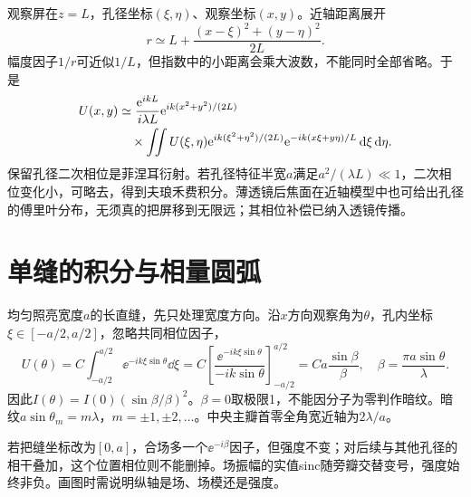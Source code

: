 观察屏在$z=L$，孔径坐标$(\xi,\eta)$、观察坐标$(x,y)$。近轴距离展开
\[
 r\simeq L+\frac{(x-\xi)^2+(y-\eta)^2}{2L}.
\]
幅度因子$1/r$可近似$1/L$，但指数中的小距离会乘大波数，不能同时全部省略。于是
\begin{align}\label{eq:o3fresnel}
 U(x,y)&\simeq\frac{\mathrm e^{ikL}}{i\lambda L}
 \mathrm e^{ik(x^2+y^2)/(2L)}\\
 &\quad\times\iint U(\xi,\eta)
 \mathrm e^{ik(\xi^2+\eta^2)/(2L)}
 \mathrm e^{-ik(x\xi+y\eta)/L}\mathop{}\!\mathrm d\xi\mathop{}\!\mathrm d\eta.\notag
\end{align}
保留孔径二次相位是菲涅耳衍射。若孔径特征半宽$a$满足$a^2/(\lambda L)\ll1$，二次相位变化小，可略去，得到夫琅禾费积分。薄透镜后焦面在近轴模型中也可给出孔径的傅里叶分布，无须真的把屏移到无限远；其相位补偿已纳入透镜传播。


\section{单缝的积分与相量圆弧}\label{th:o3slit}
均匀照亮宽度$a$的长直缝，先只处理宽度方向。沿$x$方向观察角为$\theta$，孔内坐标$\xi\in[-a/2,a/2]$，忽略共同相位因子，
\[
 U(\theta)=C\int_{-a/2}^{a/2}\ee^{-ik\xi\sin\theta}\dd\xi
 =C\left[\frac{\ee^{-ik\xi\sin\theta}}{-ik\sin\theta}\right]_{-a/2}^{a/2}
 =Ca\frac{\sin\beta}{\beta},\quad \beta=\frac{\pi a\sin\theta}\lambda.
\]
因此$I(\theta)=I(0)(\sin\beta/\beta)^2$。$\beta=0$取极限1，不能因分子为零判作暗纹。暗纹$a\sin\theta_m=m\lambda$，$m=\pm1,\pm2,\ldots$。中央主瓣首零全角宽近轴为$2\lambda/a$。

若把缝坐标改为$[0,a]$，合场多一个$\ee^{-i\beta}$因子，但强度不变；对后续与其他孔径的相干叠加，这个位置相位则不能删掉。场振幅的实值sinc随旁瓣交替变号，强度始终非负。画图时需说明纵轴是场、场模还是强度。

